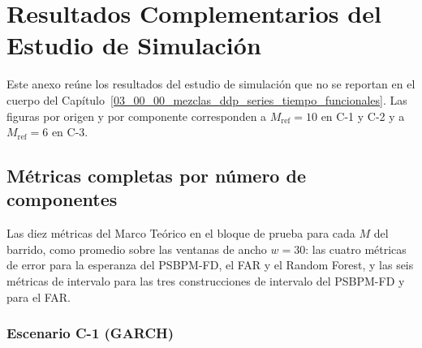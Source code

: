 \chapter{Resultados Complementarios del Estudio de Simulación}
\label{aneB_00_00_resultados_simulacion}

Este anexo reúne los resultados del estudio de simulación que no se reportan en el cuerpo del Capítulo~\ref{03_00_00_mezclas_ddp_series_tiempo_funcionales}. Las figuras por origen y por componente corresponden a $M_{\mathrm{ref}} = 10$ en C-1 y C-2 y a $M_{\mathrm{ref}} = 6$ en C-3.

\section{Métricas completas por número de componentes}
\label{aneB_00_01_metricas_por_M}

Las diez métricas del Marco Teórico en el bloque de prueba para cada $M$ del barrido, como promedio sobre las ventanas de ancho $w = 30$: las cuatro métricas de error para la esperanza del PSBPM-FD, el FAR y el Random Forest, y las seis métricas de intervalo para las tres construcciones de intervalo del PSBPM-FD y para el FAR.

\subsection{Escenario C-1 (GARCH)}
\label{aneB_00_01_02_metricas_garch}

